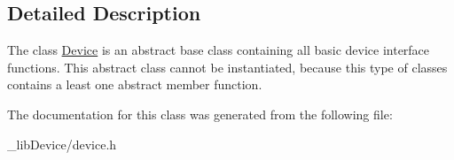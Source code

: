 \subsection{Detailed Description}
The class \hyperlink{class_device}{Device} is an abstract base class containing all basic device interface functions. This abstract class cannot be instantiated, because this type of classes contains a least one abstract member function. 

The documentation for this class was generated from the following file\+:\begin{DoxyCompactItemize}
\item 
\+\_\+lib\+Device/device.\+h\end{DoxyCompactItemize}
